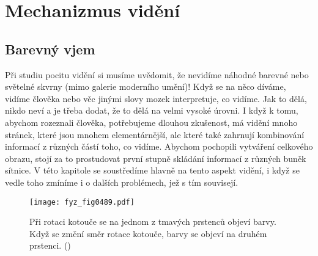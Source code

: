 \setchaptertoc
\chapter{Mechanizmus vidění}\label{fyz:IchapXXXVI}
  \section{Barevný vjem}\label{fyz:IchapXXXVIsecI}
    Při studiu pocitu vidění si musíme uvědomit, že nevidíme náhodné barevné nebo světelné skvrny
    (mimo galerie moderního umění)! Když se na něco díváme, vidíme člověka nebo věc jinými slovy
    mozek interpretuje, co vidíme. Jak to dělá, nikdo neví a je třeba dodat, že to dělá na velmi
    vysoké úrovni. I když k tomu, abychom rozeznali člověka, potřebujeme dlouhou zkušenost, má
    vidění mnoho stránek, které jsou mnohem elementárnější, ale které také zahrnují kombinování
    informací z různých částí toho, co vidíme. Abychom pochopili vytváření celkového obrazu, stojí
    za to prostudovat první stupně skládání informací z různých buněk sítnice. V této kapitole se
    soustředíme hlavně na tento aspekt vidění, i když se vedle toho zmíníme i o dalších problémech,
    jež s tím souvisejí.

    \begin{figure}[ht!] %
      \centering
      \texttt{[image: fyz\_fig0489.pdf]}
      \caption{Při rotaci kotouče se na jednom z tmavých prstenců objeví barvy. Když se změní směr
        rotace kotouče, barvy se objeví na druhém prstenci. (\cite[s.~697]{Feynman01})}
      \label{fyz:fig0489}
    \end{figure}


